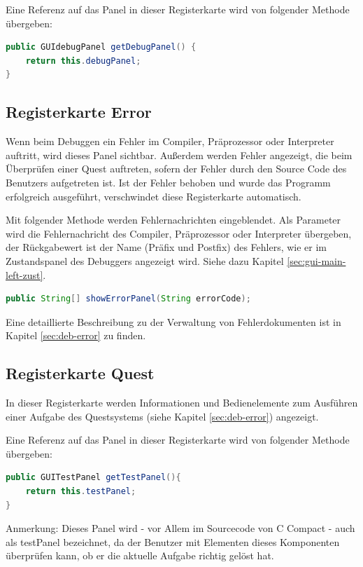 Eine Referenz auf das Panel in dieser Registerkarte wird von folgender Methode übergeben:
\begin{lstlisting}[language=JAVA]
public GUIdebugPanel getDebugPanel() {
	return this.debugPanel;
}
\end{lstlisting}

\subsection{Registerkarte \glqq{}Error\grqq{}}
\label{sec:gui-main-right-error}
Wenn beim Debuggen ein Fehler im Compiler, Präprozessor oder Interpreter auftritt, wird dieses Panel sichtbar. Außerdem werden Fehler angezeigt, die beim Überprüfen einer Quest auftreten, sofern der Fehler durch den Source Code des Benutzers aufgetreten ist. Ist der Fehler behoben und wurde das Programm erfolgreich ausgeführt, verschwindet diese Registerkarte automatisch.

Mit folgender Methode werden Fehlernachrichten eingeblendet. Als Parameter wird die Fehlernachricht des Compiler, Präprozessor oder Interpreter übergeben, der Rückgabewert ist der Name (Präfix und Postfix) des Fehlers, wie er im Zustandspanel des Debuggers angezeigt wird. Siehe dazu Kapitel \ref{sec:gui-main-left-zust}.%
\begin{lstlisting}[language=JAVA]
public String[] showErrorPanel(String errorCode);
\end{lstlisting}

Eine detaillierte Beschreibung zu der Verwaltung von Fehlerdokumenten ist in Kapitel \ref{sec:deb-error} zu finden.

\subsection{Registerkarte \glqq{}Quest\grqq{}}
In dieser Registerkarte werden Informationen und Bedienelemente zum Ausführen einer Aufgabe des Questsystems (siehe Kapitel \ref{sec:deb-error}) angezeigt.

Eine Referenz auf das Panel in dieser Registerkarte wird von folgender Methode übergeben:
\begin{lstlisting}[language=JAVA]
public GUITestPanel getTestPanel(){
	return this.testPanel;
}
\end{lstlisting}

Anmerkung: Dieses Panel wird - vor Allem im Sourcecode von C Compact - auch als \glqq{}testPanel\grqq{} bezeichnet, da der Benutzer mit Elementen dieses Komponenten überprüfen kann, ob er die aktuelle Aufgabe richtig gelöst hat.

